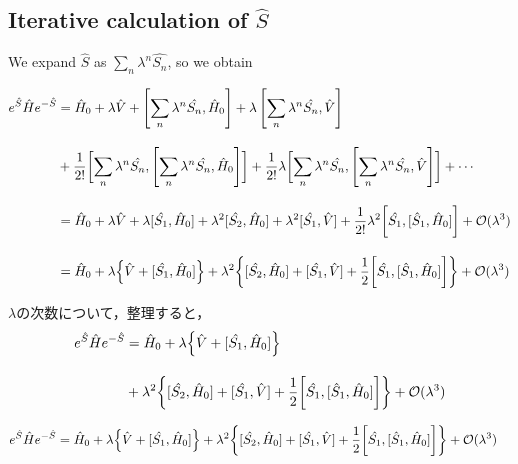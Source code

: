 \subsection{Iterative calculation of $\hat{S}$}

We expand $\hat{S}$ as $\sum_{n}\lambda^{n}\hat{S_n}$, so we obtain




\begin{align}
    e^{\hat{S}}\hat{H}e^{-\hat{S}}
    &=\hat{H}_0 + \lambda\hat{V}+\left[\sum_{n}\lambda^{n}\hat{S_n}, \hat{H}_0\right] +
    \lambda\left[\sum_{n}\lambda^{n}\hat{S_n}, \hat{V}\right]\nn[10pt]
    &+\frac{1}{2!}\biggl[
    \sum_{n}\lambda^{n}\hat{S_n}, \left[\sum_{n}\lambda^{n}\hat{S_n}, \hat{H}_0\right]
    \biggr]
    +\frac{1}{2!}\lambda\biggl[
    \sum_{n}\lambda^{n}\hat{S_n}, \left[\sum_{n}\lambda^{n}\hat{S_n}, \hat{V}\right]
    \biggr]
    +\cdots\nn[10pt]
    &=\hat{H}_0 + \lambda\hat{V}+\lambda[\hat{S_1}, \hat{H}_0] + \lambda^2[\hat{S_2}, \hat{H}_0]
    +\lambda^2[\hat{S_1}, \hat{V}]
    +\frac{1}{2!}\lambda^2\biggl[
    \hat{S_1}, [\hat{S}_{1}, \hat{H}_0]
    \biggr]
    +\mathcal{O}(\lambda^3)\nn[10pt]
    &=\hat{H}_0 + \lambda
    \Bigl\{\hat{V}+[\hat{S_1}, \hat{H}_0]\Bigr\}
    +\lambda^2
    \biggl\{[\hat{S_2}, \hat{H}_0]
    +[\hat{S_1}, \hat{V}]
    +\frac{1}{2}\biggl[
    \hat{S_1}, [\hat{S}_{1}, \hat{H}_0]
    \biggr]
    \biggr\}
    +\mathcal{O}(\lambda^3)
\end{align}



$\lambda$の次数について，整理すると，
\begin{align}
    e^{\hat{S}}\hat{H}e^{-\hat{S}}
    &=\hat{H}_0 + \lambda
    \Bigl\{\hat{V}+[\hat{S_1}, \hat{H}_0]\Bigr\}\nn[10pt]
    &+\lambda^2
    \biggl\{[\hat{S_2}, \hat{H}_0]
    +[\hat{S_1}, \hat{V}]
    +\frac{1}{2}\biggl[
    \hat{S_1}, [\hat{S}_{1}, \hat{H}_0]
    \biggr]
    \biggr\}
    +\mathcal{O}(\lambda^3)
\end{align}




\begin{align}
    e^{\hat{S}}\hat{H}e^{-\hat{S}}
    &=\hat{H}_0 + \lambda
    \Bigl\{\hat{V}+[\hat{S_1}, \hat{H}_0]\Bigr\}
    +\lambda^2
    \biggl\{[\hat{S_2}, \hat{H}_0]
    +[\hat{S_1}, \hat{V}]
    +\frac{1}{2}\biggl[
    \hat{S_1}, [\hat{S}_{1}, \hat{H}_0]
    \biggr]
    \biggr\}
    +\mathcal{O}(\lambda^3)
\end{align}


